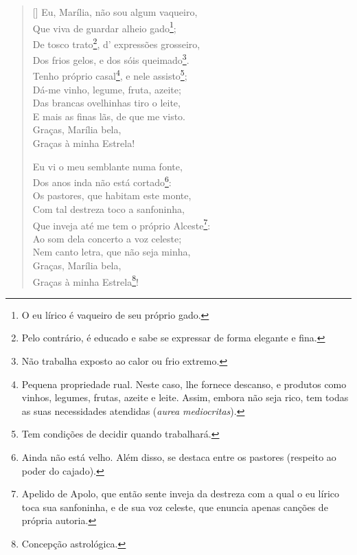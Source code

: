 \begin{verse}[\versewidth]
Eu, Marília, não sou algum vaqueiro, \\
Que viva de guardar alheio gado\footnote{O eu lírico é vaqueiro de seu próprio gado.}; \\
De tosco trato\footnote{Pelo contrário, é educado e sabe se expressar de forma elegante e fina.}, d’ expressões grosseiro, \\
Dos frios gelos, e dos sóis queimado\footnote{Não trabalha exposto ao calor ou frio extremo.}. \\
Tenho próprio casal\footnote{Pequena propriedade rual. Neste caso, lhe fornece descanso, e produtos como vinhos, legumes, frutas, azeite e leite. Assim, embora não seja rico, tem todas as suas necessidades atendidas (\textit{aurea mediocritas}).}, e nele assisto\footnote{Tem condições de decidir quando trabalhará.}; \\
Dá-me vinho, legume, fruta, azeite; \\
Das brancas ovelhinhas tiro o leite, \\
E mais as finas lãs, de que me visto. \\
\hspace{2em} Graças, Marília bela, \\
\hspace{2em} Graças à minha Estrela!
					
Eu vi o meu semblante numa fonte, \\
Dos anos inda não está cortado\footnote{Ainda não está velho. Além disso, se destaca entre os pastores (respeito ao poder do cajado).}: \\
Os pastores, que habitam este monte, \\
Com tal destreza toco a sanfoninha, \\
Que inveja até me tem o próprio Alceste\footnote{Apelido de Apolo, que então sente inveja da destreza com a qual o eu lírico toca sua sanfoninha, e de sua voz celeste, que enuncia apenas canções de própria autoria.}: \\
Ao som dela concerto a voz celeste; \\
Nem canto letra, que não seja minha, \\
\hspace{2em} Graças, Marília bela, \\
\hspace{2em} Graças à minha Estrela\footnote{Concepção astrológica.}!
					

\end{verse}
